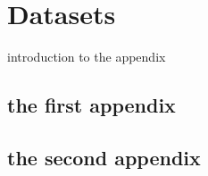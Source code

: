 \chapter{Datasets}
\label{c:dataset}


introduction to the appendix
\section{the first appendix}
\section{the second appendix}
